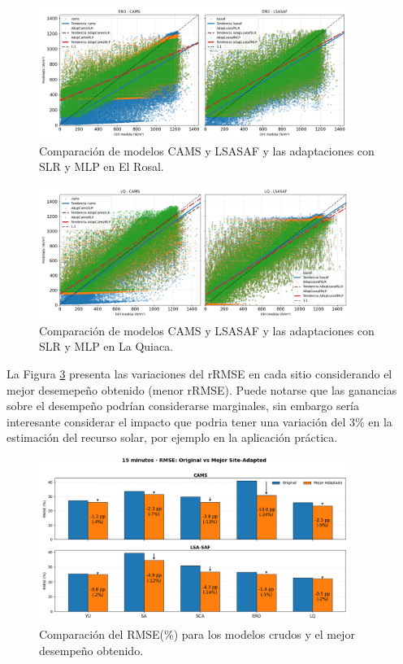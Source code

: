 \begin{figure}
    \centering
    \includegraphics[width=0.9\textwidth]{figuras/scatter_ero_1.png}
    \caption{Comparación de modelos CAMS y LSASAF y las adaptaciones con SLR y MLP en El Rosal.}
    \label{fig:scatter-ero-01}
\end{figure}



\begin{figure}
    \centering
    \includegraphics[width=0.9\textwidth]{figuras/scatter_lq_1.png}
    \caption{Comparación de modelos CAMS y LSASAF y las adaptaciones con SLR y MLP en La Quiaca.}
    \label{fig:scatter-lq-01}
\end{figure}



La Figura \ref{fig:mejorModelo} presenta las variaciones del rRMSE en cada sitio considerando el mejor desemepeño obtenido (menor rRMSE). Puede notarse que las ganancias sobre el desempeño podrían considerarse marginales, sin embargo sería interesante considerar el impacto que podria tener una variación del 3\% en la estimación del recurso solar, por ejemplo en la aplicación práctica.\\
\begin{figure}
    \centering
    \includegraphics[width=0.9\textwidth]{figuras/comparativasRMSE15.png}
    \caption{Comparación del RMSE(\%) para los modelos crudos y el mejor desempeño obtenido.}
    \label{fig:mejorModelo}
\end{figure}





